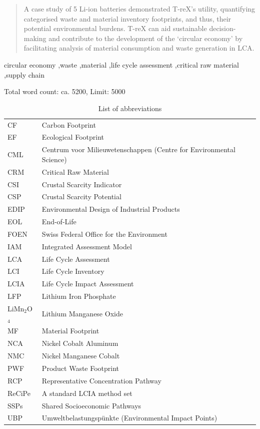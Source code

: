\documentclass[review,3p,authoryear]{elsarticle}
\newcommand{\cbox}[1]{
    \begin{tcolorbox}[hbox, colback=red!5!white, colframe=red!65!black, boxrule=0.25pt, boxsep=2pt, left=2pt, right=2pt, top=1pt, bottom=1pt]
        \small\sffamily #1
    \end{tcolorbox}
}
\begin{document}
\begin{frontmatter}
\begin{abstract}
        A case study of 5 Li-ion batteries demonstrated T-reX's utility, quantifying categorised waste and material inventory footprints, and thus, their potential environmental burdens. T-reX can aid sustainable decision-making and contribute to the development of the `circular economy' by facilitating analysis of material consumption and waste generation in LCA.

    \end{abstract}


    \begin{keyword}
        circular economy \sep waste \sep material \sep life cycle assessment \sep critical raw material \sep supply chain
    \end{keyword}

\end{frontmatter}
\cbox{Total word count: ca. 5200, Limit: 5000}

\begin{table}[H]
    \centering
    \caption{List of abbreviations}
    \label{tab:abbreviations}
    \begin{tabular}{ll}
    \toprule
    CF & Carbon Footprint \\
    EF & Ecological Footprint \\
    CML & Centrum voor Milieuwetenschappen (Centre for Environmental Science) \\
    CRM & Critical Raw Material \\
    CSI & Crustal Scarcity Indicator \\
    CSP & Crustal Scarcity Potential \\
    EDIP & Environmental Design of Industrial Products \\
    EOL & End-of-Life \\
    FOEN & Swiss Federal Office for the Environment \\
    IAM & Integrated Assessment Model \\
    LCA & Life Cycle Assessment \\
    LCI & Life Cycle Inventory \\
    LCIA & Life Cycle Impact Assessment \\
    LFP & Lithium Iron Phosphate \\
    LiMn$_2$O$_4$ & Lithium Manganese Oxide \\
    MF & Material Footprint \\
    NCA & Nickel Cobalt Aluminum \\
    NMC & Nickel Manganese Cobalt \\
    PWF & Product Waste Footprint \\
    RCP & Representative Concentration Pathway \\
    ReCiPe & A standard LCIA method set \\
    SSPs & Shared Socioeconomic Pathways \\
    UBP & Umweltbelastungspünkte (Environmental Impact Points) \\
    \bottomrule
    \end{tabular}
    \end{table}
\end{document}

